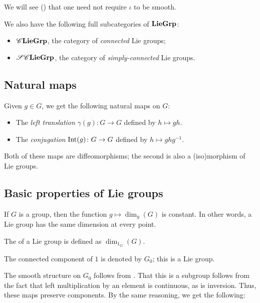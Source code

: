 \documentclass[12pt]{article}
\begin{document}
\begin{rem}
	We will see () that one need not require $\iota$ to be smooth.
\end{rem}

We also have the following full subcategories of $\mathbf{LieGrp}$:
\begin{itemize}
	\item $\mathscr{C}\mathbf{LieGrp}$, the category of \emph{connected} Lie groups;
	\item $\mathscr{S}\mathscr{C}\mathbf{LieGrp}$, the category of \emph{simply-connected} Lie groups.
\end{itemize}

\subsection{Natural maps}

Given $g \in G$, we get the following natural maps on $G$:
\begin{itemize}
	\item The \emph{left translation} $\gamma(g) \colon G \to G$ defined by $h \mapsto gh$.
	\item The \emph{conjugation} $\operatorname{Int}(g) \colon G \to G$ defined by $h \mapsto g h g^{-1}$.
\end{itemize}

Both of these maps are diffeomorphisms; the second is also a (iso)morphism of Lie groups.

\subsection{Basic properties of Lie groups}

\begin{thm}
	If $G$ is a group, then the function $g \mapsto \dim_{g}(G)$ is constant. 
	In other words, a Lie group has the same dimension at every point.
\end{thm}

\begin{defn}
	The  of a Lie group is defined as $\dim_{1_{G}}(G)$.
\end{defn}

\begin{defn}
	The connected component of $1$ is denoted by $G_{0}$; this is a Lie group.
\end{defn}
The smooth structure on $G_{0}$ follows from . 
That this is a subgroup follows from the fact that left multiplication by an element is continuous, as is inversion. 
Thus, these maps preserve components. 
By the same reasoning, we get the following:
\end{document}
